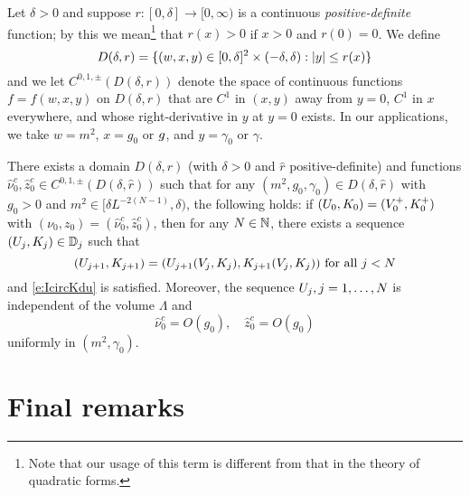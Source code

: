 Let $\delta > 0$ and suppose $r : [0, \delta] \to [0, \infty)$
is a continuous \emph{positive-definite} function; by this we
mean\footnote{Note that our usage of this term is
different from that in the theory of quadratic forms.}
that $r(x) > 0$ if $x > 0$ and $r(0) = 0$.
We define
\begin{equation}
\lbeq{Ddef}
D(\delta, r)
	=
\{ (w, x, y) \in [0, \delta]^2 \times (-\delta, \delta) : |y| \leq r(x) \}
\end{equation}
and we let $C^{0,1,\pm}(D(\delta, r))$ denote the space of continuous functions
$f = f(w, x, y)$ on $D(\delta, r)$
that are $C^1$ in $(x, y)$ away from $y = 0$, $C^1$ in $x$ everywhere,
and whose right-derivative in $y$ at $y = 0$ exists.
In our applications, we take $w = m^2$, $x = g_0$ or $g$,
and $y = \gamma_0$ or $\gamma$.

\begin{theorem}
\label{thm:rhatflow}
There exists a domain $D(\delta, \hat r)$ (with $\delta > 0$ and $\hat r$
positive-definite) and functions $\hat\nu_0^c, \hat z_0^c \in C^{0,1,\pm}(D(\delta, \hat r))$
such that for any $(m^2, g_0, \gamma_0) \in D(\delta, \hat r)$
with $g_0 > 0$ and $m^2 \in [\delta L^{-2 (N - 1)}, \delta)$, the following holds:
if $(U_0, K_0) = (V^+_0, K^+_0)$ with $(\nu_0, z_0) = (\hat\nu_0^c, \hat z_0^c)$,
then for any $N \in {\mathbb N}$, there exists a sequence $(U_j, K_j) \in \mathbb{D}_j$ such that
\begin{equation}
\label{e:VjKjDj-hat}
(U_{j+1},K_{j+1})
	=
(U_{j+1}(V_j, K_j), K_{j+1}(V_j, K_j)) \text{ for all } j < N
\end{equation}
and \eqref{e:IcircKdu} is satisfied.
Moreover, the sequence $U_j, j = 1, \ldots, N$ is independent of the volume $\Lambda$ and
\begin{equation}
\label{e:hat-est}
\hat\nu_0^c = O(g_0),
\quad
\hat z_0^c = O(g_0)
\end{equation}
uniformly in $(m^2, \gamma_0)$.
\end{theorem}


\section{Final remarks}

